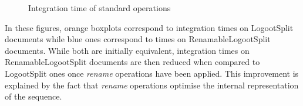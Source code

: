 \documentclass[10pt,journal,compsoc]{IEEEtran}
\let\MYoriglatexcaption\caption
\renewcommand{\caption}[2][\relax]{\MYoriglatexcaption[#2]{#2}}
\begin{document}
\begin{figure}[!ht]
    \centering
    \hfil
    \caption{Integration time of standard operations}
    \label{fig:evolution-integration-time-insert}
\end{figure}

In these figures, orange boxplots correspond to integration times on LogootSplit documents while blue ones correspond to times on RenamableLogootSplit documents.
While both are initially equivalent, integration times on RenamableLogootSplit documents are then reduced when compared to LogootSplit ones once \emph{rename} operations have been applied.
This improvement is explained by the fact that \emph{rename} operations optimise the internal representation of the sequence.
\end{document}
